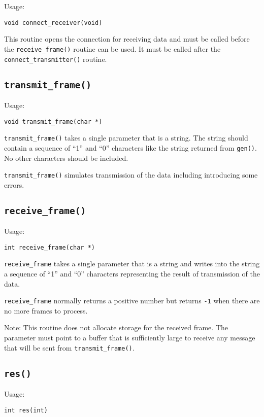 \documentclass[a4paper,10pt]{article}
\begin{document}
Usage:

\hspace*{1cm} \verb+void connect_receiver(void)+ 

This routine opens the connection for receiving data and must be called
before the \verb+receive_frame()+ routine can be used.  It must be
called after the \verb+connect_transmitter()+ routine.

\subsection{\texttt{transmit\_frame()}}

Usage:

\hspace*{1cm} \verb+void transmit_frame(char *)+ 

\verb+transmit_frame()+ takes a single parameter that is a string.
The string should contain a sequence of ``1'' and ``0'' characters
like the string returned from \verb+gen()+.  No other characters
should be included.

\verb+transmit_frame()+ simulates transmission of the data including
introducing some errors.  

\subsection{\texttt{receive\_frame()}}

Usage:

\hspace*{1cm} \verb+int receive_frame(char *)+ 

\verb+receive_frame+ takes a single parameter that is a string and
writes into the string a sequence of ``1'' and ``0'' characters
representing the result of transmission of the data.

\verb+receive_frame+ normally returns a positive number but returns
\verb+-1+ when there are no more frames to process.

Note: This routine does not allocate storage for the received frame.
The parameter must point to a buffer that is sufficiently large to
receive any message that will be sent from \verb+transmit_frame()+.

\subsection{\texttt{res()}}

Usage:

\hspace*{1cm} \verb+int res(int)+ 
\end{document}
